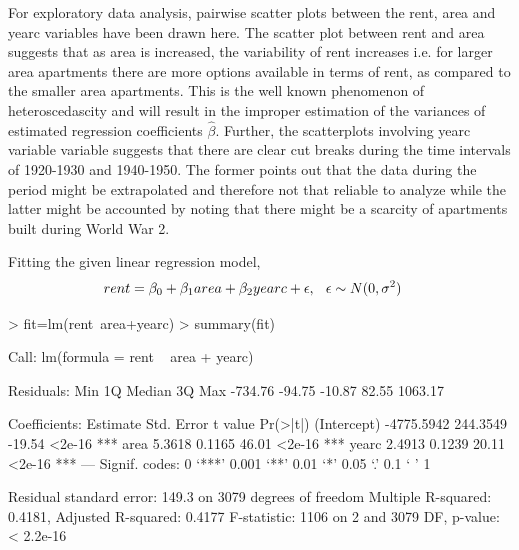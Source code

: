 \documentclass[12pt]{article}
\begin{document}
For exploratory data analysis, pairwise scatter plots between the rent, area and yearc variables have been drawn here. The scatter plot between rent and area suggests that as area is increased, the variability of rent increases i.e. for larger area apartments there are more options available in terms of rent, as compared to the smaller area apartments. This is the well known phenomenon of heteroscedascity and will result in the improper estimation of the variances of estimated regression coefficients $\hat{\beta}$. Further, the scatterplots involving yearc variable variable suggests that there are clear cut breaks during the time intervals of 1920-1930 and 1940-1950. The former points out that the data during the period might be extrapolated and therefore not that reliable to analyze while the latter might be accounted by noting that there might be a scarcity of apartments built during World War 2.

\item Fitting the given linear regression model,
\begin{equation*}
\begin{aligned}
rent &= \beta_0 + \beta_1 area + \beta_2 yearc + \epsilon, \hspace{0.1in} \epsilon \sim N(0,\sigma^2)
\end{aligned}
\end{equation*}

\begin{Schunk}
\begin{Sinput}
> fit=lm(rent~area+yearc)
> summary(fit)
\end{Sinput}
\begin{Soutput}
Call:
lm(formula = rent ~ area + yearc)

Residuals:
    Min      1Q  Median      3Q     Max 
-734.76  -94.75  -10.87   82.55 1063.17 

Coefficients:
              Estimate Std. Error t value Pr(>|t|)    
(Intercept) -4775.5942   244.3549  -19.54   <2e-16 ***
area            5.3618     0.1165   46.01   <2e-16 ***
yearc           2.4913     0.1239   20.11   <2e-16 ***
---
Signif. codes:  0 ‘***’ 0.001 ‘**’ 0.01 ‘*’ 0.05 ‘.’ 0.1 ‘ ’ 1 

Residual standard error: 149.3 on 3079 degrees of freedom
Multiple R-squared: 0.4181,	Adjusted R-squared: 0.4177 
F-statistic:  1106 on 2 and 3079 DF,  p-value: < 2.2e-16 
\end{Soutput}
\end{Schunk}
\end{document}
